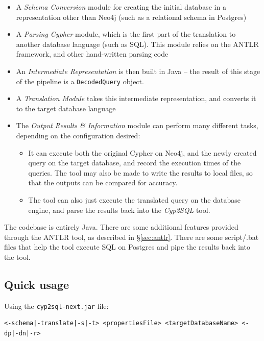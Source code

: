 \documentclass[letterpaper]{ltxdoc}
\begin{document}
\begin{itemize}
\item A \emph{Schema Conversion} module for creating the initial database in a representation other than Neo4j (such as a relational schema in Postgres)
\item A \emph{Parsing Cypher} module, which is the first part of the translation to another database language (such as SQL). This module relies on the ANTLR framework, and other hand-written parsing code
\item An \emph{Intermediate Representation} is then built in Java -- the result of this stage of the pipeline is a \texttt{DecodedQuery} object.
\item A \emph{Translation Module} takes this intermediate representation, and converts it to the target database language
\item The \emph{Output Results \& Information} module can perform many different tasks, depending on the configuration desired:
\begin{itemize}
\item It can execute both the original Cypher on Neo4j, and the newly created query on the target database, and record the execution times of the queries. The tool may also be made to write the results to local files, so that the outputs can be compared for accuracy.
\item The tool can also just execute the translated query on the database engine, and parse the results back into the \emph{Cyp2SQL} tool.
\end{itemize}
\end{itemize}

\medskip

The codebase is entirely Java. There are some additional features provided through the ANTLR tool, as described in \S \ref{sec:antlr}. There are some script/.bat files that help the tool execute SQL on Postgres and pipe the results back into the tool.

\subsection{Quick usage}
Using the \texttt{cyp2sql-next.jar} file:
\begin{verbatim}
<-schema|-translate|-s|-t> <propertiesFile> <targetDatabaseName> <-dp|-dn|-r>
\end{verbatim}
\end{document}
